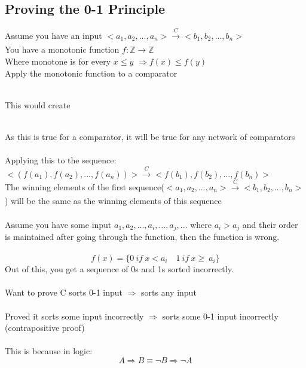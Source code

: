 \documentclass{article}[18pt]
\begin{document}
\subsection{Proving the 0-1 Principle}
Assume you have an input
$<a_1,a_2,...,a_n>\xrightarrow[]{C}<b_1,b_2,...,b_n>$\\
You have a monotonic function $f:\mathbb{Z}\rightarrow\mathbb{Z}$\\
Where monotone is for every $x\leqslant y$ $\Rightarrow f(x)\leqslant f(y)$\\
Apply the monotonic function to a comparator\\
\\
This would create\\
\\
As this is true for a comparator, it will be true for any network of comparators\\
\\
Applying this to the sequence:\\
$<(f(a_1),f(a_2),...,f(a_n))>$$\xrightarrow{C}$$<f(b_1),f(b_2),...,f(b_n)>$\\
The winning elements of the first sequence($<a_1,a_2,...,a_n>\xrightarrow[]{C}<b_1,b_2,...,b_n>$) will be the same as the winning elements of this sequence\\
\\
Assume you have some input $a_1,a_2,...,a_i,...,a_j,...$ where $a_i>a_j$ and their order is maintained after going through the function, then the function is wrong.\\
\\
$$f(x)=\{ 0 \  if \  x<a_i \quad 1 \  if \  x\geqslant \  a_i\}$$
Out of this, you get a sequence of 0s and 1s sorted incorrectly.\\
\\
Want to prove C sorts 0-1 input $\Rightarrow$ sorts any input\\
\\
Proved it sorts some input incorrectly $\Rightarrow$ sorts some 0-1 input incorrectly (contrapositive proof)\\
\\
This is because in logic:
$$A\Rightarrow B \equiv \lnot B\Rightarrow\lnot A$$
\end{document}
